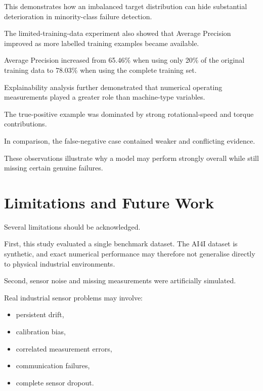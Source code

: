 \documentclass[conference]{IEEEtran}
\begin{document}
This demonstrates how an imbalanced target distribution can hide substantial deterioration in minority-class failure detection.

The limited-training-data experiment also showed that Average Precision improved as more labelled training examples became available.

Average Precision increased from 65.46\% when using only 20\% of the original training data to 78.03\% when using the complete training set.

Explainability analysis further demonstrated that numerical operating measurements played a greater role than machine-type variables.

The true-positive example was dominated by strong rotational-speed and torque contributions.

In comparison, the false-negative case contained weaker and conflicting evidence.

These observations illustrate why a model may perform strongly overall while still missing certain genuine failures.


\section{Limitations and Future Work}

Several limitations should be acknowledged.

First, this study evaluated a single benchmark dataset. The AI4I dataset is synthetic, and exact numerical performance may therefore not generalise directly to physical industrial environments.

Second, sensor noise and missing measurements were artificially simulated.

Real industrial sensor problems may involve:

\begin{itemize}

    \item persistent drift,
    \item calibration bias,
    \item correlated measurement errors,
    \item communication failures,
    \item complete sensor dropout.

\end{itemize}
\end{document}
